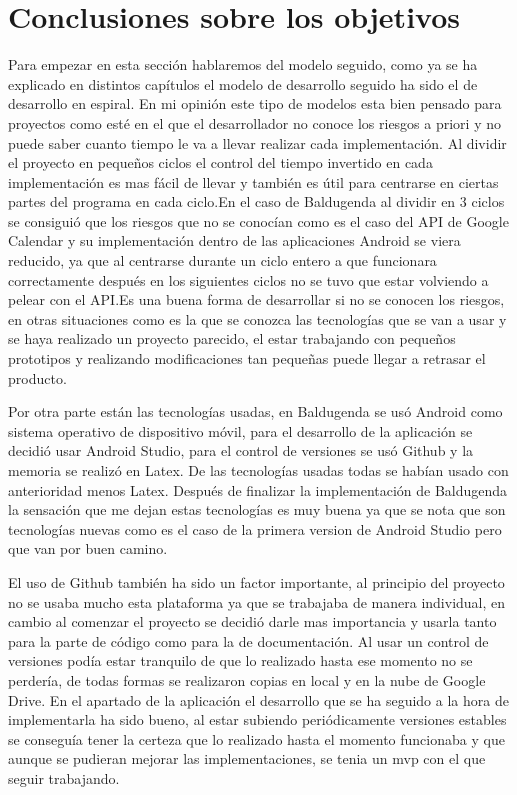 \section{Conclusiones sobre los objetivos}
\label{secc:Conclusiones sobre los objetivos}

Para empezar en esta sección hablaremos del modelo seguido, como ya se ha explicado en distintos capítulos el modelo de desarrollo seguido ha sido el de desarrollo en espiral. En mi opinión este tipo de modelos esta bien pensado para proyectos como esté en el que el desarrollador no conoce los riesgos a priori y no puede saber cuanto tiempo le va a llevar realizar cada implementación. Al dividir el proyecto en pequeños ciclos el control del tiempo invertido en cada implementación es mas fácil de llevar y también es útil para centrarse en ciertas partes del programa en cada ciclo.En el caso de Baldugenda al dividir en 3 ciclos se consiguió que los riesgos que no se conocían como es el caso del API de Google Calendar y su implementación dentro de las aplicaciones Android se viera reducido, ya que al centrarse durante un ciclo entero a que funcionara correctamente después en los siguientes ciclos no se tuvo que estar volviendo a pelear con el API.Es una buena forma de desarrollar si no se conocen los riesgos, en otras situaciones como es la que se conozca las tecnologías que se van a usar y se haya realizado un proyecto parecido, el estar trabajando con pequeños prototipos y realizando modificaciones tan pequeñas puede llegar a retrasar el producto.

Por otra parte están las tecnologías usadas, en Baldugenda se usó Android como sistema operativo de dispositivo móvil, para el desarrollo de la aplicación se decidió usar Android Studio, para el control de versiones se usó Github y la memoria se realizó en Latex. De las tecnologías usadas todas se habían usado con anterioridad menos Latex. Después de finalizar la implementación de Baldugenda  la sensación que me dejan estas tecnologías es muy buena ya que se nota que son tecnologías nuevas como es el caso de la primera version de Android Studio pero que van por buen camino. 

El uso de Github también ha sido un factor importante, al principio del proyecto no se usaba mucho esta plataforma ya que se trabajaba de manera individual, en cambio al comenzar el proyecto se decidió darle mas importancia y usarla tanto para la parte de código como para la de documentación. Al usar un control de versiones podía estar tranquilo de que lo realizado hasta ese momento no se perdería, de todas formas se realizaron copias en local y en la nube de Google Drive.
\newpage
En el apartado de la aplicación el desarrollo que se ha seguido a la hora de implementarla ha sido bueno, al estar subiendo periódicamente versiones estables se conseguía tener la certeza que lo realizado hasta el momento funcionaba y que aunque se pudieran mejorar las implementaciones, se tenia un \acrshort{mvp} con el que seguir trabajando.

